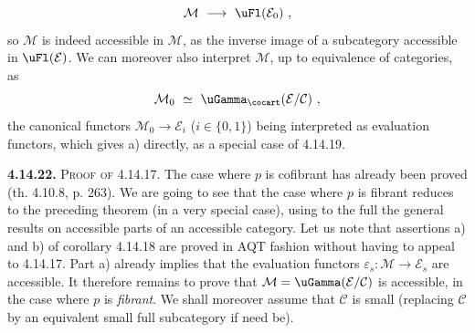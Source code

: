 \[
\mathcal{M} \ \longrightarrow \ \uFl(\mathcal{E}_0) \ ,
\]
so $\mathcal{M}$ is indeed accessible in $\mathcal{M}$, as the inverse image of a subcategory accessible in $\uFl(\mathcal{E})$. We can moreover also interpret $\mathcal{M}$, up to equivalence of categories, as %
\[
\mathcal{M}_0 \ \simeq \ \uGamma_{\cocart}(\mathcal{E}/\mathcal{C}) \ ,
\]
the canonical functors $\mathcal{M}_0 \longrightarrow \mathcal{E}_i$ ($i \in \{0,1\}$) being interpreted as evaluation functors, which gives a) directly, as a special case of 4.14.19. %


\textbf{4.14.22.} \textsc{Proof of} 4.14.17. The case where $p$ is cofibrant has already been proved (th. 4.10.8, p. 263). We are going to see that the case where $p$ is fibrant reduces to the preceding theorem (in a very special case), using to the full the general results on accessible parts of an accessible category. Let us note that assertions a) and b) of corollary 4.14.18 are proved in AQT fashion without having to appeal to 4.14.17. Part a) already implies that the evaluation functors $\varepsilon_s : \mathcal{M} \longrightarrow \mathcal{E}_s$ are accessible. It therefore remains to prove
that $\mathcal{M} = \uGamma(\mathcal{E}/\mathcal{C})$ is accessible, in the case where $p$ is \textit{fibrant}. We shall moreover assume that $\mathcal{C}$ is small (replacing $\mathcal{C}$ by an equivalent small full subcategory if need be).

